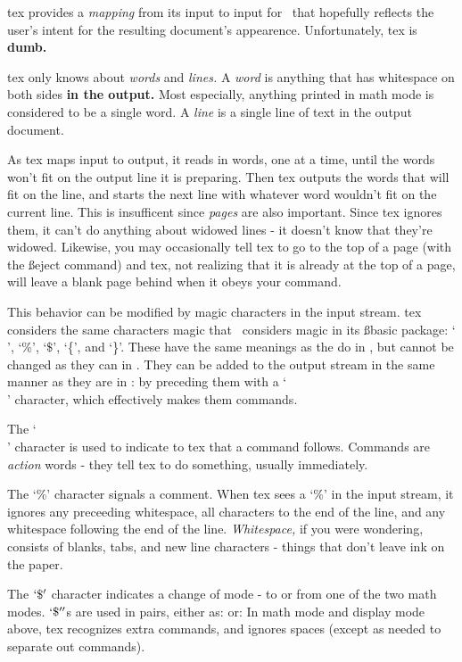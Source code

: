 
tex provides a {\it mapping} from its input to input for \pfont\ 
that hopefully reflects the user's intent for the resulting
document's appearence. Unfortunately, tex is {\bf dumb.}

tex only knows about {\it words} and {\it lines.}
A {\it word} is anything that has whitespace on both sides {\bf in
the output.} Most especially, anything printed in math mode is
considered to be a single word. A {\it line} is a single line of
text in the output document.

As tex maps input to output, it reads in words, one
at a time, until the words won't fit on the output line it is
preparing. Then tex outputs the words that will fit on
the line, and starts the next line with whatever word wouldn't
fit on the current line.  This is insufficent since {\it
pages} are also important. Since tex ignores them, it can't do
anything about widowed lines - it doesn't know that they're
widowed. Likewise, you may occasionally tell tex to go to the
top of a page (with the {\ss eject} command) and tex, not
realizing that it is already at the top of a page, will leave a
blank page behind when it obeys your command.

This behavior can be modified by magic characters in the input
stream. tex considers the same characters magic that \tex\ 
considers magic in its {\ss basic} package: `\\', `\%', `$\$$',
`\{', and `\}'. These have the same meanings as the do in \tex,
but cannot be changed as they can in \tex. They can be added to
the output stream in the same manner as they are in \tex: by
preceding them with a `\\' character, which effectively makes
them commands.

The `\\' character is used to indicate to tex that a command
follows. Commands are {\it action} words - they tell tex to do
something, usually immediately.

The `\%' character signals a comment. When tex sees a `\%' in the
input stream, it ignores any preceeding whitespace, all
characters to the end of the line, and any whitespace following
the end of the line. {\it Whitespace,} if you were wondering,
consists of blanks, tabs, and new line characters - things that
don't leave ink on the paper.

The $`\$'$ character indicates a change of mode - to or from one
of the two math modes. $`\$''$s are used in pairs, either as:
\ctrline{\ss$\$$text for math mode$\$$} or:
\ctrline{\ss$\$\$$text for display mode$\$\$$} In math mode and
display mode above, tex recognizes extra commands, and ignores
spaces (except as needed to separate out commands).

